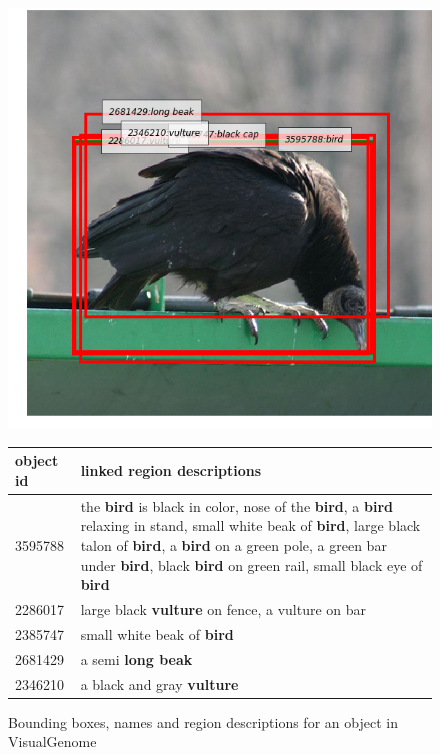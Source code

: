 \begin{figure}
\begin{center}
\includegraphics[scale=0.32]{figures/vulture.png} 
\begin{tabular}{lp{6cm}}
object id & linked region descriptions\\
\hline
3595788 & the \textbf{bird} is black in color, nose of the \textbf{bird}, a \textbf{bird} relaxing in stand, small white beak of \textbf{bird}, large black talon of \textbf{bird}, a \textbf{bird} on a green pole, a green bar under \textbf{bird}, black \textbf{bird} on green rail, small black eye of \textbf{bird}\\
2286017 & large black \textbf{vulture} on fence, a vulture on bar\\
2385747 & small white beak of \textbf{bird}\\
2681429 & a semi \textbf{long beak}\\  
2346210 & a black and gray \textbf{vulture}\\
 \end{tabular}
\caption{Bounding boxes, names and region descriptions for an object in VisualGenome}
\label{fig:bird}
\end{center}
\end{figure}

